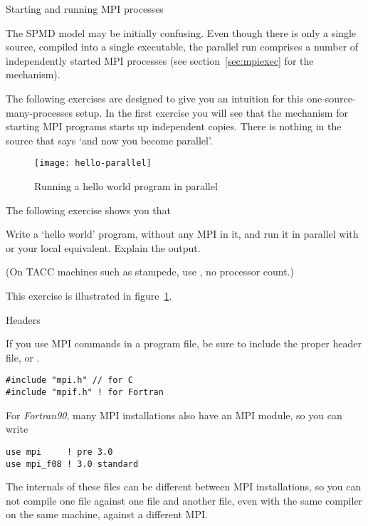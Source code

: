 
 {Starting and running MPI processes}
\label{sec:mpi-init}

The \ac{SPMD} model may be initially confusing. Even though there is
only a single source, compiled into a single executable,
the parallel run comprises a number of independently started MPI
processes (see section~\ref{sec:mpiexec} for the mechanism).

The following exercises are designed to give you an intuition for this
one-source-many-processes setup. In the first exercise you will see
that the mechanism for starting MPI programs starts up independent
copies. There is nothing in the source that says `and now you become parallel'.

\begin{figure}[ht]
  \texttt{[image: hello-parallel]}
  \caption{Running a hello world program in parallel}
  \label{fig:hello-parallel}
\end{figure}

The following exercise shows you that 
\begin{exercise}
  \label{ex:hello1}
  Write a `hello world' program, without any MPI in it,
  and run it in parallel with  or your local equivalent. 
  Explain the output.

\begin{tacc}
    (On TACC machines such as stampede, use , no
    processor count.)
\end{tacc}

\end{exercise}

This exercise is illustrated in figure~\ref{fig:hello-parallel}.

 {Headers}

If you use MPI commands in a program file, be sure to include
the proper header file,  or .
\begin{verbatim}
#include "mpi.h" // for C
#include "mpif.h" ! for Fortran
\end{verbatim}
For \emph{Fortran90}, many MPI installations
also have an MPI module, so you can write
\begin{verbatim}
use mpi     ! pre 3.0
use mpi_f08 ! 3.0 standard
\end{verbatim}
The internals of these files can be different between MPI
installations, so you can not compile one file against one 
file and another file, even with the same compiler on the same machine,
against a different MPI.

